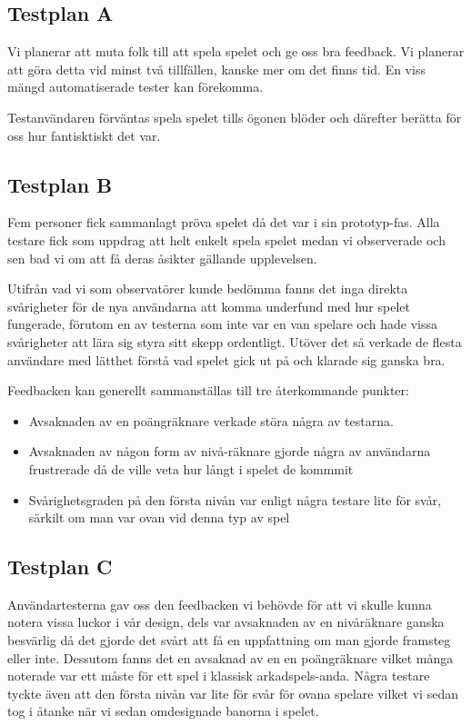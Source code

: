 \documentclass[a4paper,11pt]{article}
\begin{document}
\subsection{Testplan A}
Vi planerar att muta folk till att spela spelet och ge oss bra feedback. Vi planerar att göra detta vid minst två tillfällen, kanske mer om det finns tid. En viss mängd automatiserade tester kan förekomma.

Testanvändaren förväntas spela spelet tills ögonen blöder och därefter berätta för oss hur fantisktiskt det var. 

\subsection{Testplan B}
Fem personer fick sammanlagt pröva spelet då det var i sin prototyp-fas. Alla testare fick som uppdrag att helt enkelt spela spelet medan vi observerade och sen bad vi om att få deras åsikter gällande upplevelsen.

Utifrån vad vi som observatörer kunde bedömma fanns det inga direkta svårigheter för de nya användarna att komma underfund med hur spelet fungerade, förutom en av testerna som inte var en van spelare och hade vissa svårigheter att lära sig styra sitt skepp ordentligt. Utöver det så verkade de flesta användare med lätthet förstå vad spelet gick ut på och klarade sig ganska bra.

Feedbacken kan generellt sammanställas till tre återkommande punkter:
\begin{itemize}
\item Avsaknaden av en poängräknare verkade störa några av testarna.
\item Avsaknaden av någon form av nivå-räknare gjorde några av användarna frustrerade då de ville veta hur långt i spelet de kommmit
\item Svårighetsgraden på den första nivån var enligt några testare lite för svår, särkilt om man var ovan vid denna typ av spel
\end{itemize} 


\subsection{Testplan C}
Användartesterna gav oss den feedbacken vi behövde för att vi skulle kunna notera vissa luckor i vår design, dels var avsaknaden av en nivåräknare ganska besvärlig då det gjorde det svårt att få en uppfattning om man gjorde framsteg eller inte. Dessutom fanns det en avsaknad av en en poängräknare vilket många noterade var ett måste för ett spel i klassisk arkadspels-anda. Några testare tyckte även att den första nivån var lite för svår för ovana spelare vilket vi sedan tog i åtanke när vi sedan omdesignade banorna i spelet.
\end{document}
